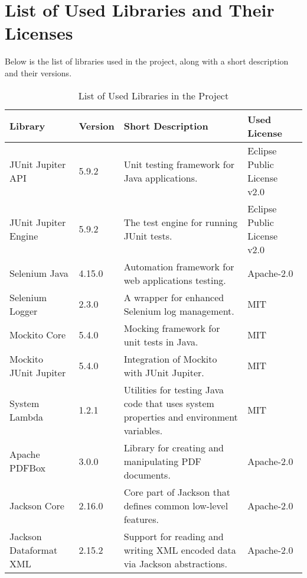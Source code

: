 \section{List of Used Libraries and Their Licenses}\label{sec:used-libraries}
Below is the list of libraries used in the project, along with a short description and their versions.
\begin{table}[ht!]
    \centering
    \setupBfhTabular
    \begin{tabular}{|p{4cm}|p{1cm}|p{5cm}|p{3cm}|} %
        \rowcolor{BFH-tablehead}
        \textbf{Library}       & \textbf{Version} & \textbf{Short Description}                                                             & \textbf{Used License}                            \\
        \hline
        JUnit Jupiter API & 5.9.2 & Unit testing framework for Java applications.
        & Eclipse Public License v2.0 \\
        \hline
        JUnit Jupiter Engine   & 5.9.2            & The test engine for running JUnit tests.
                                                      & Eclipse Public License v2.0 \\
        \hline
        Selenium Java          & 4.15.0           & Automation framework for web applications testing.
                                            & Apache-2.0 \\
        \hline
        Selenium Logger        & 2.3.0           & A wrapper for enhanced Selenium log management.
        & MIT \\
        \hline
        Mockito Core           & 5.4.0            & Mocking framework for unit tests in Java.
                                                     & MIT \\
        \hline
        Mockito JUnit Jupiter  & 5.4.0            & Integration of Mockito with JUnit Jupiter.
                                                    & MIT \\
        \hline
        System Lambda          & 1.2.1            & Utilities for testing Java code that uses system properties and environment variables.
        & MIT \\
        \hline
        Apache PDFBox          & 3.0.0            & Library for creating and manipulating PDF documents.
                                          & Apache-2.0 \\
        \hline
        Jackson Core           & 2.16.0           & Core part of Jackson that defines common low-level features.
        & Apache-2.0  \\
        \hline
        Jackson Dataformat XML & 2.15.2           & Support for reading and writing XML encoded data via Jackson abstractions.
        & Apache-2.0 \\
        \hline
    \end{tabular}
    \caption{List of Used Libraries in the Project}
    \label{tab:used-libraries}
\end{table}
